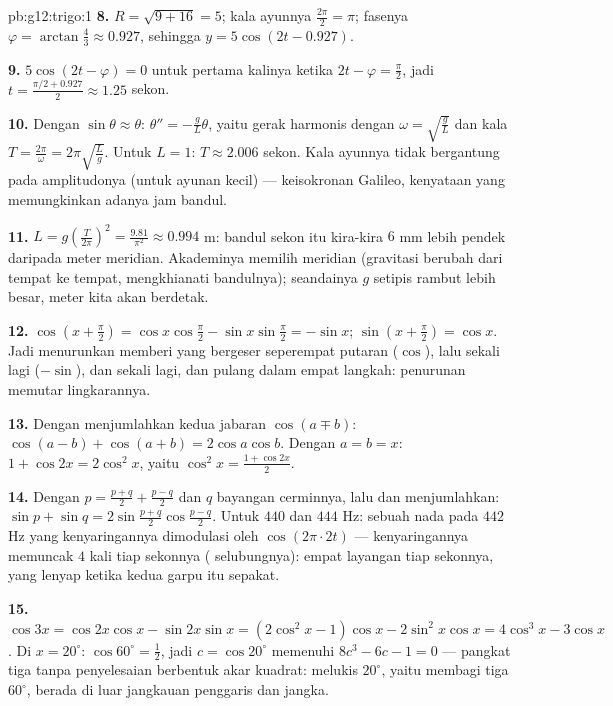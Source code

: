 \begin{solution}{pb:g12:trigo:1}
\textbf{8.} $R = \sqrt{9 + 16} = 5$; kala ayunnya
$\frac{2\pi}{2} = \pi$; fasenya
$\varphi = \arctan\frac43 \approx 0.927$, sehingga
$y = 5\cos(2t - 0.927)$.

\textbf{9.} $5\cos(2t - \varphi) = 0$ untuk pertama kalinya ketika
$2t - \varphi = \frac\pi2$, jadi
$t = \frac{\pi/2 + 0.927}{2} \approx 1.25$ sekon.

\textbf{10.} Dengan $\sin\theta \approx \theta$:
$\theta'' = -\frac gL \theta$, yaitu gerak harmonis dengan
$\omega = \sqrt{\frac gL}$ dan kala
$T = \frac{2\pi}{\omega} = 2\pi\sqrt{\frac Lg}$. Untuk
$L = 1$: $T \approx 2.006$ sekon. Kala ayunnya tidak bergantung pada
amplitudonya (untuk ayunan kecil) --- keisokronan Galileo,
kenyataan yang memungkinkan adanya jam bandul.

\textbf{11.} $L = g\left(\frac{T}{2\pi}\right)^2 =
\frac{9.81}{\pi^2} \approx 0.994$ m: bandul sekon itu
kira-kira $6$ mm lebih pendek daripada meter meridian. Akademinya memilih
meridian (gravitasi berubah dari tempat ke tempat, mengkhianati
bandulnya); seandainya $g$ setipis rambut lebih besar, meter kita akan
berdetak.

\textbf{12.} $\cos\left(x + \frac\pi2\right) =
\cos x \cos\frac\pi2 - \sin x \sin\frac\pi2 = -\sin x$;
$\sin\left(x + \frac\pi2\right) = \cos x$. Jadi menurunkan
 memberi  yang bergeser seperempat putaran ($\cos$), lalu sekali lagi
($-\sin$), dan sekali lagi, dan pulang dalam empat langkah: penurunan
memutar lingkarannya.

\textbf{13.} Dengan menjumlahkan kedua jabaran $\cos(a \mp b)$:
$\cos(a-b) + \cos(a+b) = 2\cos a\cos b$. Dengan $a = b = x$:
$1 + \cos 2x = 2\cos^2 x$, yaitu
$\cos^2 x = \frac{1 + \cos 2x}{2}$.

\textbf{14.} Dengan $p = \frac{p+q}{2} + \frac{p-q}{2}$ dan
$q$ bayangan cerminnya, lalu  dan menjumlahkan:
$\sin p + \sin q = 2\sin\frac{p+q}{2}\cos\frac{p-q}{2}$. Untuk
$440$ dan $444$ Hz: sebuah nada pada $442$ Hz yang kenyaringannya
dimodulasi oleh $\cos(2\pi \cdot 2t)$ --- kenyaringannya memuncak $4$
kali tiap sekonnya ( selubungnya): empat layangan
tiap sekonnya, yang lenyap ketika kedua garpu itu sepakat.

\textbf{15.} $\cos 3x = \cos 2x\cos x - \sin 2x \sin x =
(2\cos^2 x - 1)\cos x - 2\sin^2 x\cos x = 4\cos^3 x -
3\cos x$. Di $x = 20^\circ$: $\cos 60^\circ = \frac12$, jadi
$c = \cos 20^\circ$ memenuhi $8c^3 - 6c - 1 = 0$ ---  pangkat tiga
tanpa penyelesaian berbentuk akar kuadrat: melukis $20^\circ$, yaitu
membagi tiga $60^\circ$, berada di luar jangkauan penggaris dan jangka.


\end{solution}

